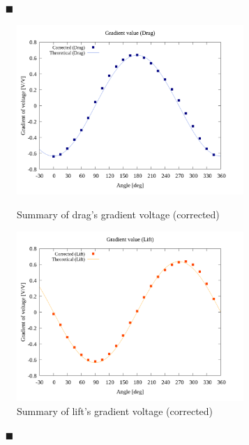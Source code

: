 \documentclass[twocolumn,a4j]{jsarticle}
\begin{document}
\newpage

\begin{itemize}
    \item [$\blacksquare$] 
\end{itemize}

\begin{figure}[htbp]
    \footnotesize
    \begin{center}
        \includegraphics[width=86mm]{../graphes/1-ex/21/21-2_corrected_drag.png}
        \caption{Summary of drag's gradient voltage (corrected)}
        \includegraphics[width=86mm]{../graphes/1-ex/21/21-2_corrected_lift.png}
        \caption{Summary of lift's gradient voltage (corrected)}
    \end{center}
\end{figure}

\newpage

\begin{itemize}
    \item [$\blacksquare$] 
\end{itemize}
\end{document}
